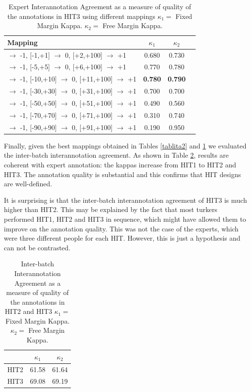\documentclass[11pt, a4paper,onecolumn]{article}
\begin{document}
\begin{table}[h]
\begin{center}
\begin{tabular}{|l|c|c|c|}
\hline
Mapping & $\kappa_{1}$ & $\kappa_{2}$ \\ 
\hline
 [-100,-2] $\rightarrow$ -1, [-1,+1] $\rightarrow$ 0, [+2,+100] $\rightarrow$ +1& 0.680 & 0.730\\ \hline
 [-100,-6] $\rightarrow$ -1, [-5,+5] $\rightarrow$ 0, [+6,+100] $\rightarrow$ +1& 0.770 & 0.780\\ \hline
 [-100,-11] $\rightarrow$ -1, [-10,+10] $\rightarrow$ 0, [+11,+100] $\rightarrow$ +1& \textbf{0.780} & \textbf{0.790}\\ \hline
 [-100,-31] $\rightarrow$ -1, [-30,+30] $\rightarrow$ 0, [+31,+100] $\rightarrow$ +1& 0.700 & 0.700\\ \hline
 [-100,-51] $\rightarrow$ -1, [-50,+50] $\rightarrow$ 0, [+51,+100] $\rightarrow$ +1& 0.490 & 0.560\\ \hline
 [-100,-71] $\rightarrow$ -1, [-70,+70] $\rightarrow$ 0, [+71,+100] $\rightarrow$ +1& 0.310 & 0.740\\ \hline
[-100,-91] $\rightarrow$ -1, [-90,+90] $\rightarrow$ 0, [+91,+100] $\rightarrow$ +1& 0.190 & 0.950\\ \hline
\end{tabular}
\end{center}
\caption{Expert Interannotation Agreement as a measure of quality of the annotations in HIT3 using different mappings $\kappa_{1} = $ Fixed Margin Kappa. $\kappa_{2} = $ Free Margin Kappa.}
\label{tablita3}
\end{table}


Finally, given the best mappings obtained in Tables \ref{tablita2} and \ref{tablita3} we evaluated the inter-batch interannotation agreement. As shown in Table  \ref{tablita4}, results are coherent with expert annotation: the kappas increase from HIT1 to HIT2 and HIT3. The annotation quality is substantial and this confirms that HIT designs are well-defined. 

It is surprising is that the inter-batch interannotation agreement 
of HIT3 is much higher than HIT2. This may be explained by the fact that most turkers performed HIT1, HIT2 and HIT3 in sequence, which might have allowed them to improve on the annotation quality. This was not the case of the experts, which were three different people for each HIT. However, this is just a hypothesis and can not be contrasted. 

\begin{table}[h]
\begin{center}
\begin{tabular}{|l|c|c|}
\hline
 & $\kappa_{1}$ & $\kappa_{2}$ \\ 
\hline
HIT2&   61.58 & 61.64\\ \hline
HIT3&   69.08 & 69.19\\ \hline
\end{tabular}
\end{center}
\caption{Inter-batch Interannotation Agreement as a measure of quality of the annotations in HIT2 and HIT3 $\kappa_{1} = $ Fixed Margin Kappa. $\kappa_{2} = $ Free Margin Kappa.}
\label{tablita4}
\end{table}
\end{document}
